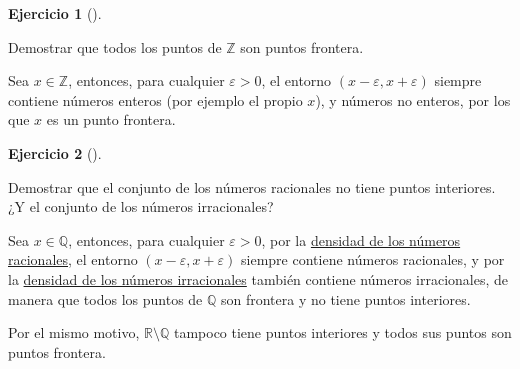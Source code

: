 \documentclass[
  a4paper,
]{scrreport}
\theoremstyle{definition}
\newtheorem{exercise}{Ejercicio}[chapter]
\theoremstyle{remark}
\begin{document}
\leavevmode{}%
\begin{exercise}[]\label{exr-frontera-enteros}

Demostrar que todos los puntos de \(\mathbb{Z}\) son puntos frontera.

\end{exercise}

\begin{tcolorbox}[enhanced jigsaw, coltitle=black, left=2mm, opacityback=0, colback=white, opacitybacktitle=0.6, breakable, colbacktitle=quarto-callout-tip-color!10!white, leftrule=.75mm, toptitle=1mm, arc=.35mm, bottomtitle=1mm, rightrule=.15mm, titlerule=0mm, title=\textcolor{quarto-callout-tip-color}{\faLightbulb}\hspace{0.5em}{Solución}, colframe=quarto-callout-tip-color-frame, toprule=.15mm, bottomrule=.15mm]
Sea \(x\in\mathbb{Z}\), entonces, para cualquier \(\varepsilon>0\), el
entorno \((x-\varepsilon, x+\varepsilon)\) siempre contiene números
enteros (por ejemplo el propio \(x\)), y números no enteros, por los que
\(x\) es un punto frontera.
\end{tcolorbox}

\leavevmode{}%
\begin{exercise}[]\label{exr-interior-racionales-irracionales}

Demostrar que el conjunto de los números racionales no tiene puntos
interiores. ¿Y el conjunto de los números irracionales?

\end{exercise}

\begin{tcolorbox}[enhanced jigsaw, coltitle=black, left=2mm, opacityback=0, colback=white, opacitybacktitle=0.6, breakable, colbacktitle=quarto-callout-tip-color!10!white, leftrule=.75mm, toptitle=1mm, arc=.35mm, bottomtitle=1mm, rightrule=.15mm, titlerule=0mm, title=\textcolor{quarto-callout-tip-color}{\faLightbulb}\hspace{0.5em}{Solución}, colframe=quarto-callout-tip-color-frame, toprule=.15mm, bottomrule=.15mm]
Sea \(x\in\mathbb{Q}\), entonces, para cualquier \(\varepsilon>0\), por
la
\href{https://aprendeconalf.es/analisis-manual/cuerpo-reales.html\#thm-densidad-racionales}{densidad
de los números racionales}, el entorno
\((x-\varepsilon, x+\varepsilon)\) siempre contiene números racionales,
y por la
\href{https://aprendeconalf.es/analisis-manual/cuerpo-reales.html\#thm-densidad-irracionales}{densidad
de los números irracionales} también contiene números irracionales, de
manera que todos los puntos de \(\mathbb{Q}\) son frontera y no tiene
puntos interiores.

Por el mismo motivo, \(\mathbb{R}\setminus\mathbb{Q}\) tampoco tiene
puntos interiores y todos sus puntos son puntos frontera.
\end{tcolorbox}
\end{document}
